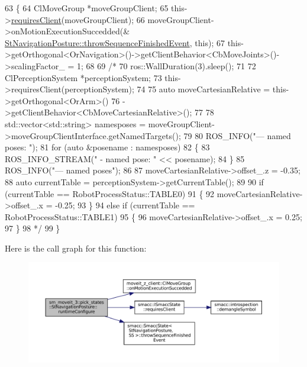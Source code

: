 \begin{DoxyCode}
63     \{
64         ClMoveGroup *moveGroupClient;
65         this->\hyperlink{classsmacc_1_1ISmaccState_a7f95c9f0a6ea2d6f18d1aec0519de4ac}{requiresClient}(moveGroupClient);
66         moveGroupClient->onMotionExecutionSuccedded(&
      \hyperlink{classsmacc_1_1SmaccState_a49dcfc25824f7e083dd4b999c49ab2b6}{StNavigationPosture::throwSequenceFinishedEvent}, \textcolor{keyword}{this});
67         this->getOrthogonal<OrNavigation>()->getClientBehavior<CbMoveJoints>()->scalingFactor\_ = 1;
68 
69         \textcolor{comment}{/*}
70 \textcolor{comment}{        ros::WallDuration(3).sleep();}
71 \textcolor{comment}{}
72 \textcolor{comment}{        ClPerceptionSystem *perceptionSystem;}
73 \textcolor{comment}{        this->requiresClient(perceptionSystem);}
74 \textcolor{comment}{}
75 \textcolor{comment}{        auto moveCartesianRelative = this->getOrthogonal<OrArm>()}
76 \textcolor{comment}{                                         ->getClientBehavior<CbMoveCartesianRelative>();}
77 \textcolor{comment}{}
78 \textcolor{comment}{        std::vector<std::string> namesposes = moveGroupClient->moveGroupClientInterface.getNamedTargets();}
79 \textcolor{comment}{}
80 \textcolor{comment}{        ROS\_INFO("--- named poses: ");}
81 \textcolor{comment}{        for (auto &posename : namesposes)}
82 \textcolor{comment}{        \{}
83 \textcolor{comment}{            ROS\_INFO\_STREAM(" - named pose: " << posename);}
84 \textcolor{comment}{        \}}
85 \textcolor{comment}{        ROS\_INFO("--- named poses");}
86 \textcolor{comment}{}
87 \textcolor{comment}{        moveCartesianRelative->offset\_.z = -0.35;}
88 \textcolor{comment}{        auto currentTable = perceptionSystem->getCurrentTable();}
89 \textcolor{comment}{}
90 \textcolor{comment}{        if (currentTable == RobotProcessStatus::TABLE0)}
91 \textcolor{comment}{        \{}
92 \textcolor{comment}{            moveCartesianRelative->offset\_.x = -0.25;}
93 \textcolor{comment}{        \}}
94 \textcolor{comment}{        else if (currentTable == RobotProcessStatus::TABLE1)}
95 \textcolor{comment}{        \{}
96 \textcolor{comment}{            moveCartesianRelative->offset\_.x = 0.25;}
97 \textcolor{comment}{        \}}
98 \textcolor{comment}{    */}
99     \}
\end{DoxyCode}
Here is the call graph for this function\+:
\nopagebreak
\begin{figure}[H]
\begin{center}
\leavevmode
\includegraphics[width=350pt]{structsm__moveit__3_1_1pick__states_1_1StNavigationPosture_ac5647836bb2596454c7bb660106fc5f0_cgraph}
\end{center}
\end{figure}
